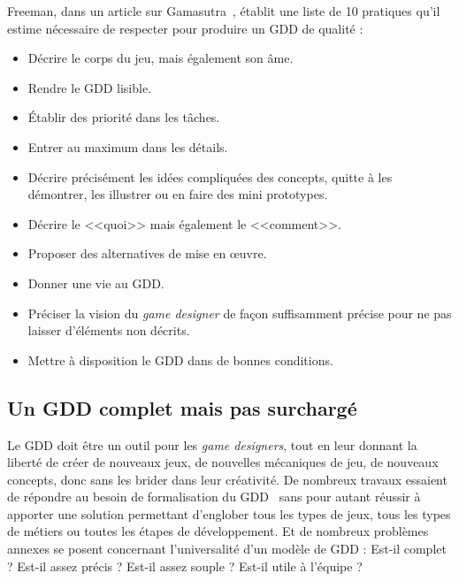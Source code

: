 Freeman, dans un article sur Gamasutra~\cite{gama_greateGDD}, établit une liste de 10 pratiques qu'il estime nécessaire de respecter pour produire un GDD de qualité :
\begin{itemize}
    \item Décrire le corps du jeu, mais également son âme.
    \item Rendre le GDD lisible.
    \item Établir des priorité dans les tâches.
    \item Entrer au maximum dans les détails.
    \item Décrire précisément les idées compliquées des concepts, quitte à les démontrer, les illustrer ou en faire des mini prototypes.
    \item Décrire le <<quoi>> mais également le <<comment>>.
    \item Proposer des alternatives de mise en \oe{}uvre.
    \item Donner une vie au GDD.
    \item Pr\'eciser la vision du \emph{game designer} de fa\c{c}on suffisamment précise pour ne pas laisser d'éléments non décrits.
    \item Mettre à disposition le GDD dans de bonnes conditions. 
\end{itemize}

\subsection{Un GDD complet mais pas surchargé}


Le GDD doit \^etre un outil pour les \emph{game designers}, tout en leur donnant la liberté de créer de nouveaux jeux, de nouvelles mécaniques de jeu, de nouveaux concepts, donc sans les brider dans leur cr\'eativit\'e.
De nombreux travaux essaient de répondre au besoin de formalisation du GDD~\cite{multiview,gama_greateGDD,GDD_GDProject,GDD_software} sans pour autant réussir à apporter une solution permettant d'englober tous les types de jeux, tous les types de métiers ou toutes les étapes de développement.
Et de nombreux problèmes annexes se posent concernant l'universalité d'un modèle de GDD : Est-il complet ? Est-il assez précis ? Est-il assez souple ? Est-il utile à l'équipe ? 


